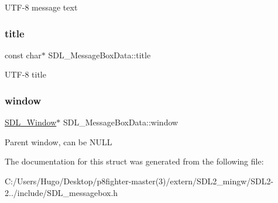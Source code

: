 U\+T\+F-\/8 message text \mbox{\label{struct_s_d_l___message_box_data_a93ceeafeed20b553ad4c86c9be37f117}} 
\subsubsection{\texorpdfstring{title}{title}}
{\footnotesize\ttfamily const char$\ast$ S\+D\+L\+\_\+\+Message\+Box\+Data\+::title}

U\+T\+F-\/8 title \mbox{\label{struct_s_d_l___message_box_data_a5c333bc93705c66068e140bc28daedcb}} 
\subsubsection{\texorpdfstring{window}{window}}
{\footnotesize\ttfamily \hyperlink{_s_d_l__video_8h_a55a196c7d3b8497538632c79ae1e6392}{S\+D\+L\+\_\+\+Window}$\ast$ S\+D\+L\+\_\+\+Message\+Box\+Data\+::window}

Parent window, can be N\+U\+LL 

The documentation for this struct was generated from the following file\+:\begin{DoxyCompactItemize}
\item 
C\+:/\+Users/\+Hugo/\+Desktop/p8fighter-\/master(3)/extern/\+S\+D\+L2\+\_\+mingw/\+S\+D\+L2-\/2../include/S\+D\+L\+\_\+messagebox.\+h\end{DoxyCompactItemize}
